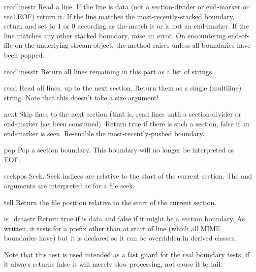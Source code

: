 \begin{methoddesc}{readline}{str}
Read a line.  If the line is data (not a section-divider or end-marker
or real EOF) return it.  If the line matches the most-recently-stacked
boundary, return  and set  to 1 or 0 according as
the match is or is not an end-marker.  If the line matches any other
stacked boundary, raise an error.  On encountering end-of-file on the
underlying stream object, the method raises  unless
all boundaries have been popped.
\end{methoddesc}

\begin{methoddesc}{readlines}{str}
Return all lines remaining in this part as a list of strings.
\end{methoddesc}

\begin{methoddesc}{read}{}
Read all lines, up to the next section.  Return them as a single
(multiline) string.  Note that this doesn't take a size argument!
\end{methoddesc}

\begin{methoddesc}{next}{}
Skip lines to the next section (that is, read lines until a
section-divider or end-marker has been consumed).  Return true if
there is such a section, false if an end-marker is seen.  Re-enable
the most-recently-pushed boundary.
\end{methoddesc}

\begin{methoddesc}{pop}{}
Pop a section boundary.  This boundary will no longer be interpreted
as EOF.
\end{methoddesc}

\begin{methoddesc}{seek}{pos}
Seek.  Seek indices are relative to the start of the current section.
The  and  arguments are interpreted as for a file
seek.
\end{methoddesc}

\begin{methoddesc}{tell}{}
Return the file position relative to the start of the current section.
\end{methoddesc}

\begin{methoddesc}{is_data}{str}
Return true if  is data and false if it might be a section
boundary.  As written, it tests for a prefix other than  at
start of line (which all MIME boundaries have) but it is declared so
it can be overridden in derived classes.

Note that this test is used intended as a fast guard for the real
boundary tests; if it always returns false it will merely slow
processing, not cause it to fail.
\end{methoddesc}

